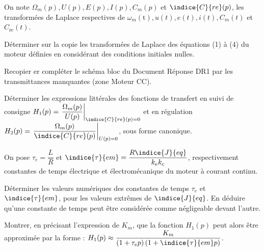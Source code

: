 On note $\Omega_{m}(p), U(p), E(p), I(p), C_{m}(p)$ et $\indice{C}{re}(p)$, les transformées de Laplace respectives de $\omega_{m}(\mathrm{t}), u(t), e(t), i(t), C_{m}(t)$ et $C_{\text {re}}(t)$.


\begin{question}
Déterminer sur la copie les transformées de Laplace des équations (1) à (4) du moteur définies en considérant des conditions initiales nulles. 
\end{question}

\begin{question}
Recopier er compléter le schéma bloc du Document Réponse DR1 par les transmittances manquantes (zone Moteur CC).
\end{question}


\begin{question}
Déterminer les expressions littérales des fonctions de transfert en suivi de consigne $H_{1}(p)=\left.\dfrac{\Omega_{m}(p)}{U(p)}\right|_{\indice{C}{re}(p)=0}$ et en régulation $H_{2}(p)=\left.\dfrac{\Omega_{m}(p)}{\indice{C}{re}(p)}\right|_{U(p)=0}$, sous forme canonique.
\end{question}

On pose $\tau_{e}=\dfrac{L}{R}$ et $\indice{\tau}{em}=\dfrac{R \indice{J}{eq}}{k_{e} k_{c}}$, respectivement constantes de temps électrique et électromécanique du moteur à courant continu.

\begin{question}
Déterminer les valeurs numériques des constantes de temps $\tau_{e}$ et $\indice{\tau}{e m}$, pour les valeurs extrêmes de $\indice{J}{eq}$. En déduire qu'une constante de temps peut être considérée comme négligeable devant l'autre.
\end{question}


\begin{question}
Montrer, en précisant l'expression de $K_{m}$, que la fonction $H_{1}(p)$ peut alors être approximée par la forme : $H_{1}(p) \approx \dfrac{K_{m}}{\left(1+\tau_{e} p\right)\left(1+\indice{\tau}{e m} p\right)}$.
\end{question}
  
  
